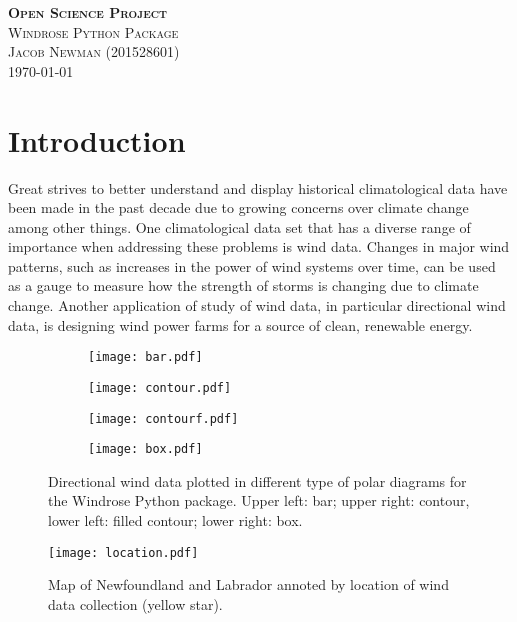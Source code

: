 \documentclass{article}
\begin{document}
\begin{titlepage}
\newcommand{\HRule}{\rule{\linewidth}{0.5mm}}

\center
\textsc{\LARGE \textbf{Open Science Project}}\\[1 cm]

\textsc{\Large Windrose Python Package}\\[0.5 cm]

\textsc{\large Jacob Newman (201528601)}\\[0.5 cm]





\vfill\vfill\vfill
{\large\today}
\vfill

\end{titlepage}


\section{Introduction}\label{Introduction}
Great strives to better understand and display historical climatological data have been made in the past decade due to growing concerns over climate change among other things. One climatological data set 
that has a diverse range of importance when addressing these problems is wind data. Changes in major wind patterns, such as increases in the power of wind systems over time, can be used as a gauge to 
measure how the strength of storms is changing due to climate change. Another application of study of wind data, in particular directional wind data, is designing wind power farms for a source of clean, 
renewable energy.   

\begin{figure}[h!]
\begin{subfigure}{.55\textwidth}
\centering
\texttt{[image: bar.pdf]}
\label{bar_windrose}
\end{subfigure}
\begin{subfigure}{.55\textwidth}
\centering
\texttt{[image: contour.pdf]}
\label{contour}
\end{subfigure}
\begin{subfigure}{.55\textwidth}
\centering
\texttt{[image: contourf.pdf]}
\label{contourf_windrose}
\end{subfigure}
\begin{subfigure}{.55\textwidth}
\centering
\texttt{[image: box.pdf]}
\label{box_windrose}
\end{subfigure}
\label{windrose_diagrams}
\caption{Directional wind data plotted in different type of polar diagrams for the Windrose Python package. 
Upper left: bar; upper right: contour, lower left: filled contour; lower right: box.}
\end{figure}

\begin{figure}[0.5\textwidth]
\centering
\texttt{[image: location.pdf]}
\label{location}
\caption{Map of Newfoundland and Labrador annoted by location of wind data collection (yellow star).}
\end{figure}
\end{document}
